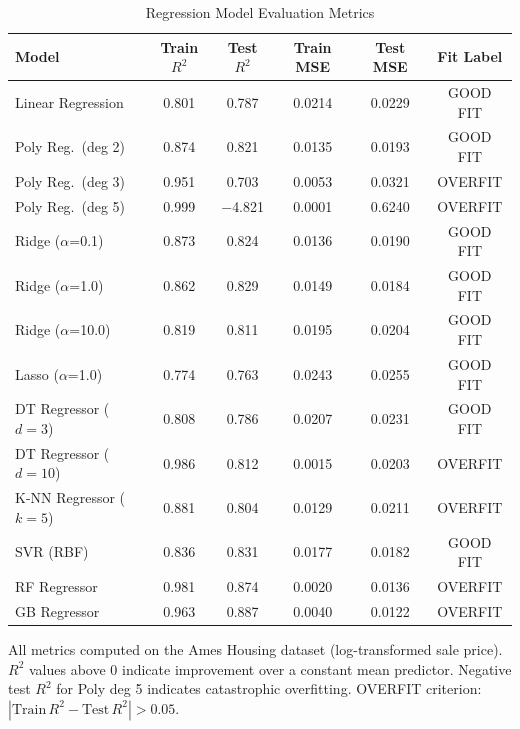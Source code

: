 \documentclass[conference]{IEEEtran}
\begin{document}
\begin{table}[!t]
    \caption{Regression Model Evaluation Metrics}
    \label{tab:regression}
    \centering
    \small
    \renewcommand{\arraystretch}{1.3}
    \begin{tabular}{|>{\raggedright\arraybackslash}p{1.7in}|c|c|c|c|c|}
    \hline
    \textbf{Model} & \textbf{Train $R^2$} & \textbf{Test $R^2$} & \textbf{Train MSE} & \textbf{Test MSE} & \textbf{Fit Label} \\
    \hline
    Linear Regression              & 0.801 & 0.787 & 0.0214 & 0.0229 & GOOD FIT \\
    \hline
    Poly Reg.\ (deg 2)             & 0.874 & 0.821 & 0.0135 & 0.0193 & GOOD FIT \\
    \hline
    Poly Reg.\ (deg 3)             & 0.951 & 0.703 & 0.0053 & 0.0321 & OVERFIT \\
    \hline
    Poly Reg.\ (deg 5)             & 0.999 & $-$4.821 & 0.0001 & 0.6240 & OVERFIT \\
    \hline
    Ridge ($\alpha$=0.1)           & 0.873 & 0.824 & 0.0136 & 0.0190 & GOOD FIT \\
    \hline
    Ridge ($\alpha$=1.0)           & 0.862 & 0.829 & 0.0149 & 0.0184 & GOOD FIT \\
    \hline
    Ridge ($\alpha$=10.0)          & 0.819 & 0.811 & 0.0195 & 0.0204 & GOOD FIT \\
    \hline
    Lasso ($\alpha$=1.0)           & 0.774 & 0.763 & 0.0243 & 0.0255 & GOOD FIT \\
    \hline
    DT Regressor ($d=3$)           & 0.808 & 0.786 & 0.0207 & 0.0231 & GOOD FIT \\
    \hline
    DT Regressor ($d=10$)          & 0.986 & 0.812 & 0.0015 & 0.0203 & OVERFIT \\
    \hline
    K-NN Regressor ($k=5$)         & 0.881 & 0.804 & 0.0129 & 0.0211 & OVERFIT \\
    \hline
    SVR (RBF)                      & 0.836 & 0.831 & 0.0177 & 0.0182 & GOOD FIT \\
    \hline
    RF Regressor                   & 0.981 & 0.874 & 0.0020 & 0.0136 & OVERFIT \\
    \hline
    GB Regressor                   & 0.963 & 0.887 & 0.0040 & 0.0122 & OVERFIT \\
    \hline
    \end{tabular}
    \begin{flushleft}
    \small All metrics computed on the Ames Housing dataset (log-transformed sale price). $R^2$ values above 0 indicate improvement over a constant mean predictor. Negative test $R^2$ for Poly deg 5 indicates catastrophic overfitting. OVERFIT criterion: $|\text{Train}\,R^2 - \text{Test}\,R^2| > 0.05$.
    \end{flushleft}
\end{table}
\end{document}
